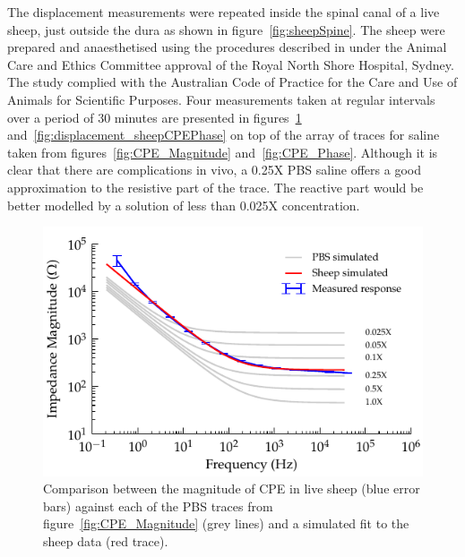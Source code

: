 \documentclass[journal, a4paper]{IEEEtran}
\begin{document}
The displacement measurements were repeated inside the spinal canal of a live sheep, just outside the dura as shown in figure~\ref{fig:sheepSpine}. The sheep were prepared and anaesthetised using the procedures described in \cite{Parker2013} under the Animal Care and Ethics Committee approval of the Royal North Shore Hospital, Sydney. The study complied with the Australian Code of Practice for the Care and Use of Animals for Scientific Purposes.
Four measurements taken at regular intervals over a period of 30 minutes are presented in figures~\ref{fig:displacement_sheepCPEMagnitude} and~\ref{fig:displacement_sheepCPEPhase} on top of the array of traces for saline taken from figures~\ref{fig:CPE_Magnitude} and~\ref{fig:CPE_Phase}.
Although it is clear that there are complications in vivo, a 0.25X PBS saline offers a good approximation to the resistive part of the trace.
The reactive part would be better modelled by a solution of less than 0.025X concentration.

\begin{figure}
    \begin{center}
        \includegraphics{graphics/displacement-withSheep_impedanceVsFrequency_magnitude}
    \end{center}
    \caption{Comparison between the magnitude of CPE in live sheep (blue error bars) against each of the PBS traces from figure~\ref{fig:CPE_Magnitude} (grey lines) and a simulated fit to the sheep data (red trace).}
    \label{fig:displacement_sheepCPEMagnitude}
\end{figure}
\end{document}
